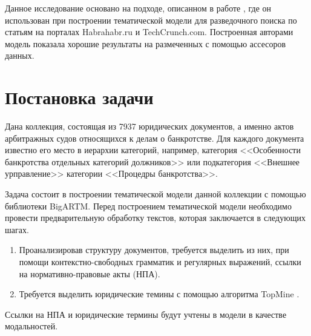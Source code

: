 \documentclass[12pt]{article}
\begin{document}





Данное исследование основано на подходе, описанном в работе \cite{Ianina_2017}, где он использован при построении тематической модели для разведочного поиска по статьям на порталах Habrahabr.ru и TechCrunch.com. Построенная авторами модель показала хорошие результаты на размеченных с помощью ассесоров данных.

\section{Постановка задачи}

Дана коллекция, состоящая из 7937 юридических документов, а именно актов арбитражных судов относящихся к делам о банкротстве. Для каждого документа известно его место в иерархии категорий, например, категория <<Особенности банкротства отдельных категорий должников>> или подкатегория <<Внешнее урправление>>  категории <<Процедры банкротства>>.

Задача состоит в построении тематической модели данной коллекции с помощью библиотеки BigARTM. Перед построением тематической модели необходимо провести предварительную обработку текстов, которая заключается в следующих шагах.
\begin{enumerate} 
  \item Проанализировав структуру документов, требуется выделить из них, при помощи контекстно-свободных грамматик и регулярных выражений, ссылки на нормативно-правовые акты (НПА).
  \item Требуется выделить юридические темины с помощью алгоритма TopMine \cite{El-Kishky2014}.
\end{enumerate}
Ссылки на НПА и юридические термины будут учтены в модели в качестве модальностей.
\end{document}
